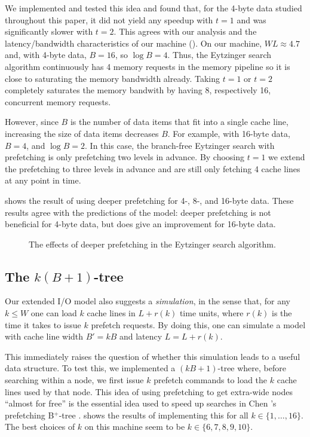 \documentclass{patmorin}
\begin{document}
We implemented and tested this idea and found that, for the 4-byte data
studied throughout this paper, it did not yield any speedup with $t=1$ and
was significantly slower with $t=2$.  This agrees with our analysis and
the latency/bandwidth characteristics of our machine ().
On our machine, $WL\approx 4.7$ and, with 4-byte data, $B=16$, so
$\log B=4$.  Thus, the Eytzinger search algorithm continuously has 4
memory requests in the memory pipeline so it is close to saturating the
memory bandwidth already.  Taking $t=1$ or $t=2$ completely saturates
the memory bandwith by having $8$, respectively 16, concurrent memory requests.

However, since $B$ is the number of data items that fit into a single
cache line, increasing the size of data items decreases $B$. For example,
with 16-byte data, $B=4$, and $\log B=2$.  In this case, the branch-free
Eytzinger search with prefetching is only prefetching two levels in
advance. By choosing $t=1$ we extend the prefetching to three levels in
advance and are still only fetching 4 cache lines at any point in time.

 shows the result of using deeper prefetching for 4-, 8-,
and 16-byte data.  These results agree with the predictions of the model:
deeper prefetching is not beneficial for 4-byte data, but does give an
improvement for 16-byte data.

\begin{figure}
   \caption{The effects of deeper prefetching in the Eytzinger search algorithm.}
\end{figure}

\subsection{The $k(B+1)$-tree}

Our extended I/O model also suggests a \emph{simulation}, in the sense
that, for any $k\le W$ one can load $k$ cache lines in $L+r(k)$ time
units, where $r(k)$ is the time it takes to issue $k$ prefetch requests.
By doing this, one can simulate a model with cache line width $B'=kB$
and latency $L=L+r(k)$.

This immediately raises the question of whether this simulation leads to
a useful data structure.  To test this, we implemented a $(kB+1)$-tree
where, before searching within a node, we first issue $k$ prefetch
commands to load the $k$ cache lines used by that node.  This idea of
using prefetching to get extra-wide nodes ``almost for free'' is the
essential idea used to speed up searches in Chen \etal's prefetching
B$^+$-tree \cite{chen.gibbons.ea:improving}.   shows
the results of implementing this for all $k\in\{1,\ldots,16\}$. The best
choices of $k$ on this machine seem to be $k\in\{6,7,8,9,10\}$.
\end{document}

